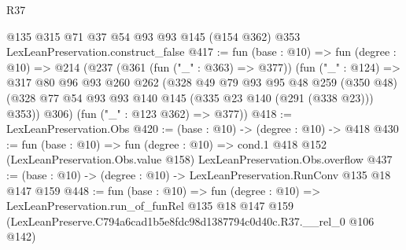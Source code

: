 \begin{lexlean}{R37}
\begin{coremodule}
    @135
    @315
    @71
    @37
    @54
    @93
    @93
    @145
    (@154 @362)
    @353
    LexLeanPreservation.construct_false
@417 := fun (base : @10) =>
  fun (degree : @10) =>
  @214
    (@237
      (@361 (fun ("_" : @363) => @377))
      (fun ("_" : @124) =>
      @317
        @80
        @96
        @93
        @260
        @262
        (@328
          @49
          @79
          @93
          @95
          @48
          @259
          (@350 @48)
          (@328 @77 @54 @93 @93 @140 @145 (@335 @23 @140 (@291 (@338 @23))) @353))
        @306)
      (fun ("_" : @123 @362) => @377))
@418 := LexLeanPreservation.Obs
@420 := (base : @10) -> (degree : @10) -> @418
@430 := fun (base : @10) =>
  fun (degree : @10) =>
  cond.{1} @418 @152 (LexLeanPreservation.Obs.value @158) LexLeanPreservation.Obs.overflow
@437 := (base : @10) -> (degree : @10) -> LexLeanPreservation.RunConv @135 @18 @147 @159
@448 := fun (base : @10) =>
  fun (degree : @10) =>
  LexLeanPreservation.run_of_funRel
    @135
    @18
    @147
    @159
    (LexLeanPreserve.C794a6cad1b5e8fdc98d1387794c0d40c.R37.__rel_0 @106 @142)
\end{coremodule}
\end{lexlean}
